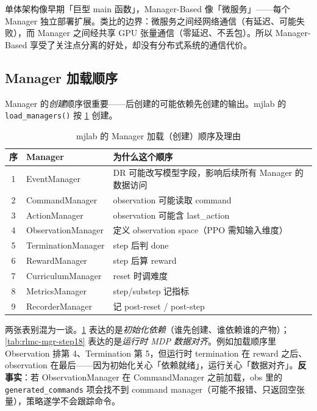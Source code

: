 \begin{insight}[微服务类比及其边界]\label{ins:rlmc-mgr-micro}
单体架构像早期「巨型 main 函数」，Manager-Based 像「微服务」——每个 Manager 独立部署扩展。类比的边界：微服务之间经网络通信（有延迟、可能失败），而 Manager 之间经共享 GPU 张量通信（零延迟、不丢包）。所以 Manager-Based 享受了关注点分离的好处，却没有分布式系统的通信代价。
\end{insight}

\subsection{Manager 加载顺序}
\label{sec:rlmc-mgr-loadorder}

Manager 的\emph{创建}顺序很重要——后创建的可能依赖先创建的输出。mjlab 的 \verb|load_managers()| 按 \cref{tab:rlmc-mgr-loadorder} 创建。

\begin{table}[ht]
\centering
\caption{mjlab 的 Manager 加载（创建）顺序及理由}
\label{tab:rlmc-mgr-loadorder}
\small
\begin{tabular}{@{}cll@{}}
\toprule
序 & Manager & 为什么这个顺序 \\
\midrule
1 & EventManager & DR 可能改写模型字段，影响后续所有 Manager 的数据访问 \\
2 & CommandManager & observation 可能读取 command \\
3 & ActionManager & observation 可能含 last\_action \\
4 & ObservationManager & 定义 observation space（PPO 需知输入维度） \\
5 & TerminationManager & step 后判 done \\
6 & RewardManager & step 后算 reward \\
7 & CurriculumManager & reset 时调难度 \\
8 & MetricsManager & step/substep 记指标 \\
9 & RecorderManager & 记 post-reset / post-step \\
\bottomrule
\end{tabular}
\end{table}

\begin{insight}\label{ins:rlmc-mgr-order}
两张表别混为一谈。\cref{tab:rlmc-mgr-loadorder} 表达的是\emph{初始化依赖}（谁先创建、谁依赖谁的产物）；\cref{tab:rlmc-mgr-step18} 表达的是\emph{运行时 MDP 数据对齐}。例如加载顺序里 Observation 排第 4、Termination 第 5，但运行时 termination 在 reward 之后、observation 在最后——因为初始化关心「依赖就绪」，运行关心「数据对齐」。\textbf{反事实}：若 ObservationManager 在 CommandManager 之前加载，obs 里的 \verb|generated_commands| 项会找不到 command manager（可能不报错、只返回空张量），策略遂学不会跟踪命令。
\end{insight}

